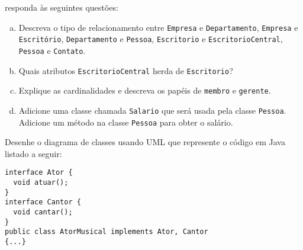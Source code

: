 \begin{center}
\end{center}

\noindent responda às seguintes questões:

\begin{enumerate}[a)]
\item Descreva o tipo de relacionamento entre {\tt Empresa} e {\tt Departamento},
{\tt Empresa} e {\tt Escritório}, {\tt Departamento} e {\tt Pessoa}, {\tt Escritorio} 
e {\tt EscritorioCentral}, {\tt Pessoa} e {\tt Contato}.
\item Quais atributos {\tt EscritorioCentral} herda de {\tt Escritorio}?
\item Explique as cardinalidades e descreva os papéis de {\tt membro} e {\tt gerente}.
\item Adicione uma classe chamada {\tt Salario} que será usada pela classe {\tt Pessoa}. 
Adicione um método na classe {\tt Pessoa} para obter o salário.
\end{enumerate}

 Desenhe o diagrama de classes usando UML que represente
o código em Java listado a seguir:

\begin{center}
\begin{lstlisting}
interface Ator {
  void atuar();
}
interface Cantor {
  void cantar();
}
public class AtorMusical implements Ator, Cantor
{...}
\end{lstlisting}
\end{center}
